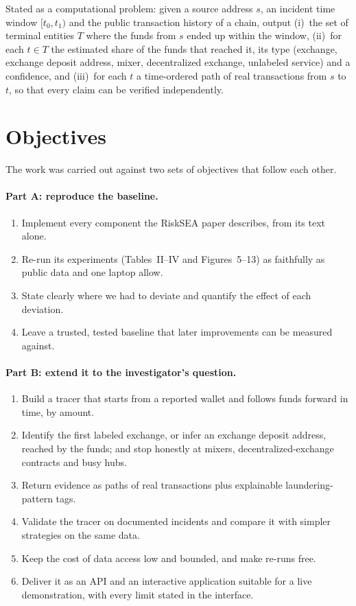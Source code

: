 Stated as a computational problem: given a source address $s$, an incident time window $[t_0,t_1)$ and the public transaction history of a chain, output (i)~the set of terminal entities $T$ where the funds from $s$ ended up within the window, (ii)~for each $t\in T$ the estimated share of the funds that reached it, its type (exchange, exchange deposit address, mixer, decentralized exchange, unlabeled service) and a confidence, and (iii)~for each $t$ a time-ordered path of real transactions from $s$ to $t$, so that every claim can be verified independently.

\section{Objectives}
The work was carried out against two sets of objectives that follow each other.

\paragraph{Part A: reproduce the baseline.}
\begin{enumerate}
\item Implement every component the RiskSEA paper describes, from its text alone.
\item Re-run its experiments (Tables~II--IV and Figures~5--13) as faithfully as public data and one laptop allow.
\item State clearly where we had to deviate and quantify the effect of each deviation.
\item Leave a trusted, tested baseline that later improvements can be measured against.
\end{enumerate}

\paragraph{Part B: extend it to the investigator's question.}
\begin{enumerate}
\item Build a tracer that starts from a reported wallet and follows funds forward in time, by amount.
\item Identify the first labeled exchange, or infer an exchange deposit address, reached by the funds; and stop honestly at mixers, decentralized-exchange contracts and busy hubs.
\item Return evidence as paths of real transactions plus explainable laundering-pattern tags.
\item Validate the tracer on documented incidents and compare it with simpler strategies on the same data.
\item Keep the cost of data access low and bounded, and make re-runs free.
\item Deliver it as an API and an interactive application suitable for a live demonstration, with every limit stated in the interface.
\end{enumerate}

